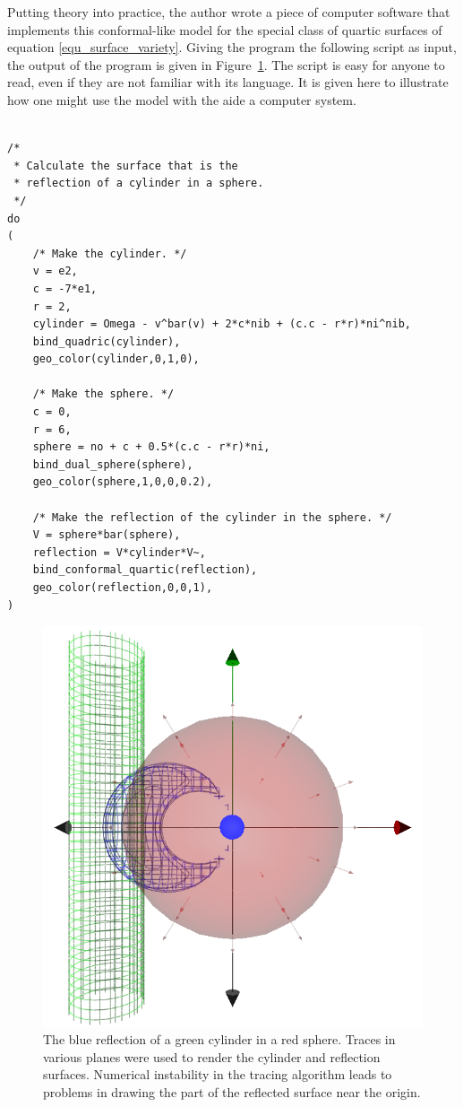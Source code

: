 \documentclass{birkjour}
\theoremstyle{definition}
\theoremstyle{remark}
\numberwithin{equation}{section}
\begin{document}
Putting theory into practice, the author wrote a piece of computer
software that implements this conformal-like model for the special class of
quartic surfaces of equation \eqref{equ_surface_variety}.  Giving the program the following
script as input, the output of the program is given in Figure~\ref{fig_reflect_cylinder_in_sphere}.
The script is easy for anyone to read, even if they are not familiar with its language.  It is given
here to illustrate how one might use the model with the aide a computer system.
{\small
\begin{verbatim}

/*
 * Calculate the surface that is the
 * reflection of a cylinder in a sphere.
 */
do
(
    /* Make the cylinder. */
    v = e2,
    c = -7*e1,
    r = 2,
    cylinder = Omega - v^bar(v) + 2*c*nib + (c.c - r*r)*ni^nib,
    bind_quadric(cylinder),
    geo_color(cylinder,0,1,0),
	
    /* Make the sphere. */
    c = 0,
    r = 6,
    sphere = no + c + 0.5*(c.c - r*r)*ni,
    bind_dual_sphere(sphere),
    geo_color(sphere,1,0,0,0.2),
	
    /* Make the reflection of the cylinder in the sphere. */
    V = sphere*bar(sphere),
    reflection = V*cylinder*V~,
    bind_conformal_quartic(reflection),
    geo_color(reflection,0,0,1),
)
\end{verbatim}
}
\begin{figure}
\includegraphics[scale=0.4]{ReflectCylinderInSphere}
\caption{The blue reflection of a green cylinder in a red sphere.  Traces in various planes were
used to render the cylinder and reflection surfaces.  Numerical instability in the tracing algorithm
leads to problems in drawing the part of the reflected surface near the origin.}
\label{fig_reflect_cylinder_in_sphere}
\end{figure}
\end{document}
